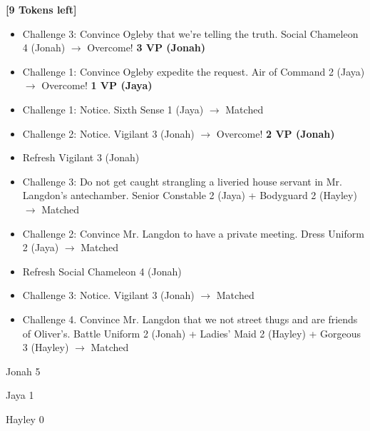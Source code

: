 \textbf{{[}9 Tokens left{]}}





\begin{itemize}
\item Challenge 3: Convince Ogleby that we're telling the truth. Social Chameleon 4 (Jonah) $\rightarrow$ Overcome! \textbf{3 VP (Jonah)}
\item Challenge 1: Convince Ogleby expedite the request. Air of Command 2 (Jaya) $\rightarrow$ Overcome! \textbf{1 VP (Jaya)}
\item Challenge 1: Notice. Sixth Sense 1 (Jaya) $\rightarrow$ Matched
\item Challenge 2: Notice. Vigilant 3 (Jonah) $\rightarrow$ Overcome! \textbf{2 VP (Jonah)}
\item Refresh Vigilant 3 (Jonah)
\item Challenge 3: Do not get caught strangling a liveried house servant in Mr. Langdon's antechamber. Senior Constable 2 (Jaya) + Bodyguard 2 (Hayley) $\rightarrow$ Matched
\item Challenge 2: Convince Mr. Langdon to have a private meeting. Dress Uniform 2 (Jaya) $\rightarrow$ Matched
\item Refresh Social Chameleon 4 (Jonah)
\item Challenge 3: Notice. Vigilant 3 (Jonah) $\rightarrow$ Matched
\item Challenge 4.  Convince Mr. Langdon that we not street thugs and are friends of Oliver's.  Battle Uniform 2 (Jonah) + Ladies' Maid 2 (Hayley) + Gorgeous 3 (Hayley)  $\rightarrow$ Matched
\end{itemize}



{\parskip=0pt
Jonah 5

Jaya 1

Hayley 0
}





